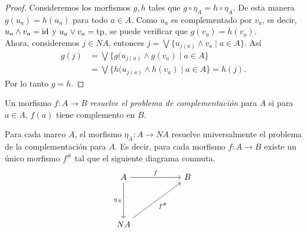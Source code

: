 \begin{proof}
    Consideremos los morfismos $g, h$ tales que $g\circ \eta_A=h\circ \eta_A$. De esta manera $g(u_a)=h(u_a)$ para todo $a\in A$. Como $u_a$ es complementado por $v_a$, es decir, $u_a\wedge v_a=\mathrm{id}$ y $u_a\vee v_a=\mathrm{tp}$, se puede verificar que $g(v_a)=h(v_a)$.\\

    Ahora, consideremos $j\in NA$, entonces 
    $j=\bigvee\{u_{j(a)}\wedge v_a\mid a\in A\}$. Así
    \[
    \begin{split}
    g(j)& =\bigvee\{g(u_{j(a)}\wedge g(v_a)\mid a\in A\}
    \\
    & =\bigvee\{h(u_{j(a)}\wedge h(v_a)\mid a\in A\}=h(j).
    \end{split}
    \]
    Por lo tanto $g=h$.
\end{proof}

Un morfismo $f\colon A\to B$ \emph{resuelve el problema de complementación} para $A$ si para $a\in A$, $f(a)$ tiene complemento en $B$.

\begin{thm}\label{Teorema6.2.2}
    Para cada marco $A$, el morfismo $\eta_A\colon A\to NA$ resuelve universalmente el problema de la complementación para $A$. Es decir, para cada morfismo $f\colon A\to B$ existe un único morfismo $f^\#$ tal que el siguiente diagrama conmuta.
    \[\begin{tikzcd}
	A && B \\
	& {} \\
	NA
	\arrow["f", from=1-1, to=1-3]
	\arrow["{\eta_A}"', from=1-1, to=3-1]
	\arrow["{f^\#}"', from=3-1, to=1-3]
\end{tikzcd}\]
\end{thm}

